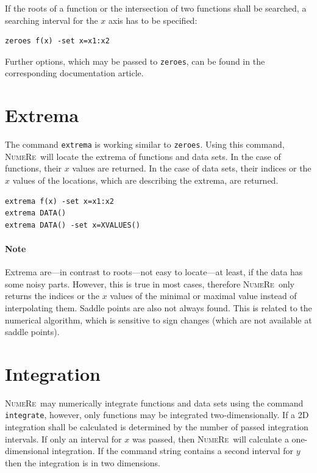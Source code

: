 \documentclass[DIV=14,headsepline,footsepline]{scrbook}
\newcommand{\NR}{\textsc{Nu\-me\-Re}}
\begin{document}
				If the roots of a function or the intersection of two functions shall be searched, a searching interval for the $x$ axis has to be specified:
				\begin{lstlisting}
zeroes f(x) -set x=x1:x2
				\end{lstlisting}
				
				Further options, which may be passed to \lstinline+zeroes+, can be found in the corresponding documentation article.
				
			\section{Extrema}
				The command \lstinline+extrema+ is working similar to \lstinline+zeroes+. Using this command, \NR\ will locate the extrema of functions and data sets. In the case of functions, their $x$ values are returned. In the case of data sets, their indices or the $x$ values of the locations, which are describing the extrema, are returned.
				\begin{lstlisting}
extrema f(x) -set x=x1:x2
extrema DATA()
extrema DATA() -set x=XVALUES()
				\end{lstlisting}
				\paragraph{Note} Extrema are---in contrast to roots---not easy to locate---at least, if the data has some noisy parts. However, this is true in most cases, therefore \NR\ only returns the indices or the $x$ values of the minimal or maximal value instead of interpolating them. Saddle points are also not always found. This is related to the numerical algorithm, which is sensitive to sign changes (which are not available at saddle points).
				
			\section{Integration}
				\NR\ may numerically integrate functions and data sets using the command \lstinline+integrate+, however, only functions may be integrated two-dimensionally. If a 2D integration shall be calculated is determined by the number of passed integration intervals. If only an interval for $x$ was passed, then \NR\ will calculate a one-dimensional integration. If the command string contains a second interval for $y$ then the integration is in two dimensions.
				
\end{document}
